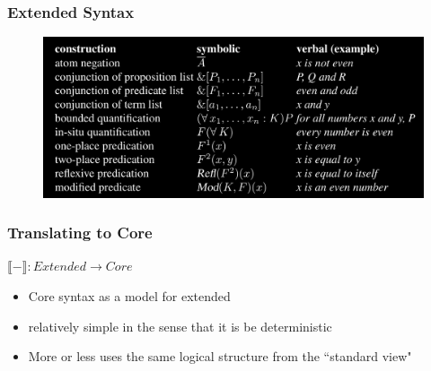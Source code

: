 \documentclass[10pt]{beamer}
\begin{document}
\begin{frame}
\frametitle{Extended Syntax}

\begin{figure}
\hspace*{-3mm}%
   \includegraphics[width= \paperwidth]{e.png}
\end{figure}
\end{frame}


\begin{frame}
\frametitle{Translating to Core}
$\llbracket - \rrbracket : Extended \to Core$

\begin{itemize}
\item Core syntax as a model for extended
\item relatively simple in the sense that it is be deterministic
\item More or less uses the same logical structure from the ``standard view"
\end{itemize}
\end{frame}
\end{document}
